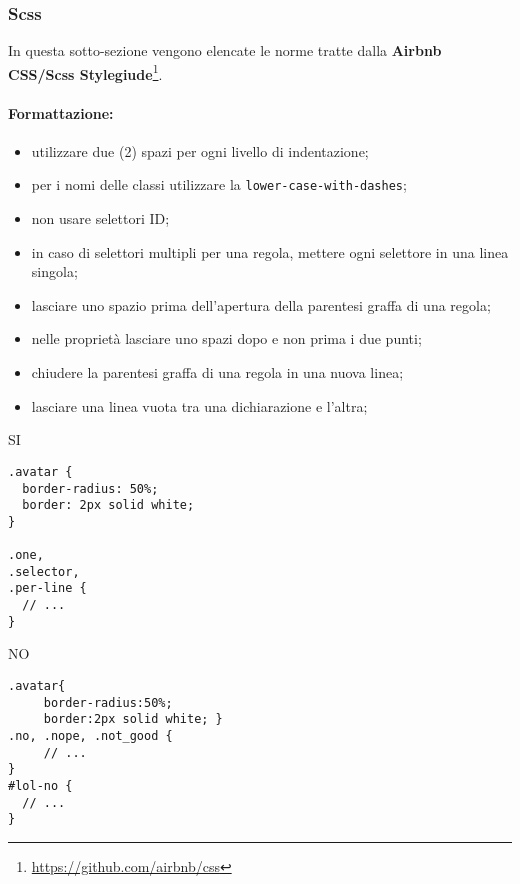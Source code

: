 \documentclass[../ProcessiPrimari.tex]{subfiles}
\begin{document}
	
\subsubsection{Scss}
In questa sotto-sezione vengono elencate le norme tratte dalla \textbf{Airbnb\\ CSS/Scss Stylegiude}\footnote{\href{https://github.com/airbnb/css}{https://github.com/airbnb/css}}.
\paragraph*{Formattazione:}
\begin{itemize}
	\item utilizzare due (2) spazi per ogni livello di indentazione;
	\item per i nomi delle classi utilizzare la \texttt{lower-case-with-dashes};
	\item non usare selettori ID;
	\item in caso di selettori multipli per una regola, mettere ogni selettore in una linea singola;
	\item lasciare uno spazio prima dell'apertura della parentesi graffa di una regola;
	\item nelle proprietà lasciare uno spazi dopo e non prima i due punti;
	\item chiudere la parentesi graffa di una regola in una nuova linea;
	\item lasciare una linea vuota tra una dichiarazione e l'altra;
\end{itemize}
\begin{center}{
\begin{minipage}{6cm}
{\begin{center}SI\end{center}}
\begin{Verbatim}[frame=single]
.avatar {
  border-radius: 50%;
  border: 2px solid white;
}

.one,
.selector,
.per-line {
  // ...
}
\end{Verbatim}
\end{minipage}
\hfil
\begin{minipage}{7cm}
{\begin{center}NO\end{center}}
\begin{Verbatim}[frame=single]
.avatar{
     border-radius:50%;
     border:2px solid white; }
.no, .nope, .not_good {
     // ...
}
#lol-no {
  // ...
}

\end{Verbatim}
\end{minipage}
}
\end{center}
\end{document}
